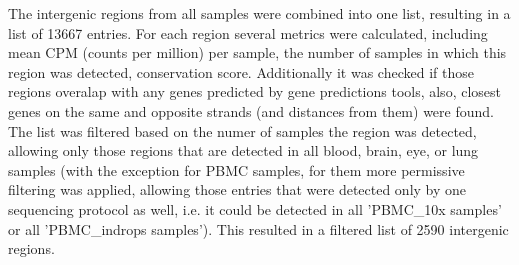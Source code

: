 The intergenic regions from all samples were combined into one list, resulting in a list of 13667 entries.
For each region several metrics were calculated, including mean CPM (counts per million) per sample,
the number of samples in which this region was detected, conservation score.
Additionally it was checked if those regions overalap with any genes predicted by gene predictions tools,
also, closest genes on the same and opposite strands (and distances from them) were found.
The list was filtered based on the numer of samples the region was detected, allowing only those regions that are detected in all
blood, brain, eye, or lung samples (with the exception for PBMC samples,
for them more permissive filtering was applied, allowing those entries that were detected only by one sequencing protocol as well,
i.e. it could be detected in all 'PBMC\_10x samples' or all 'PBMC\_indrops samples').
This resulted in a filtered list of 2590 intergenic regions.

